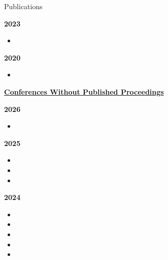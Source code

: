 \documentclass{resume} %
\begin{document}
\begin{rSection}{Publications}
\begin{itemize}
    

\end{itemize}

{\bf\large 2023}
\begin{itemize}
    

    \item {}%
 \end{itemize}

{\bf\large 2020}
\begin{itemize}
\item {}%



\end{itemize}



\bigskip
\underline{{\bf\Large Conferences Without Published Proceedings}}

{\bf\large 2026}
\begin{itemize}

 \item {}

   \end{itemize}
   


{\bf\large 2025}
\begin{itemize}

 \item {}
 \item {}
 \item {}
   \end{itemize}

   
{\bf\large 2024}

\begin{itemize}
 \item {}
 \item {}
 \item {}
 \item {}
\item {}

   \end{itemize}
   

\end{rSection}
\end{document}
